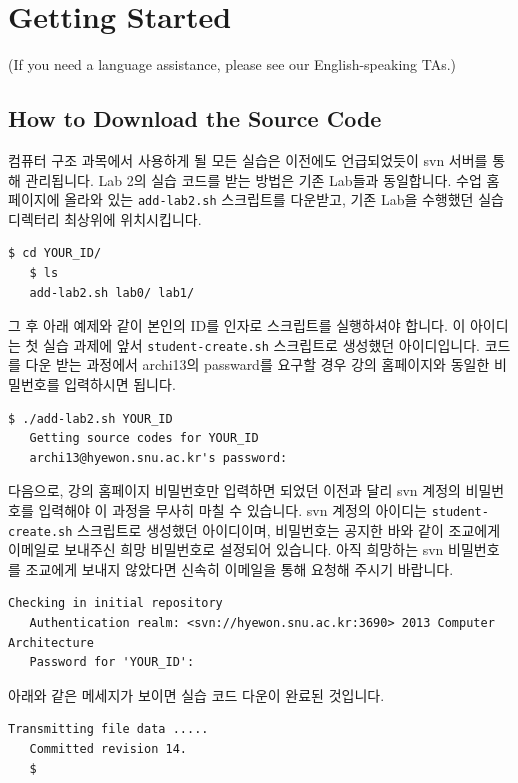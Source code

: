 \documentclass{article}
\begin{document}
\section{Getting Started}
(If you need a language assistance, please see our English-speaking TAs.)
\subsection{How to Download the Source Code}
컴퓨터 구조 과목에서 사용하게 될 모든 실습은 이전에도 언급되었듯이 svn 서버를 통해 관리됩니다.
Lab 2의 실습 코드를 받는 방법은 기존 Lab들과 동일합니다.
수업 홈페이지에 올라와 있는 \texttt{add-lab2.sh} 스크립트를 다운받고,
기존 Lab을 수행했던 실습 디렉터리 최상위에 위치시킵니다.

\begin{Verbatim}[frame=single]
   $ cd YOUR_ID/
   $ ls
   add-lab2.sh lab0/ lab1/
\end{Verbatim}
그 후 아래 예제와 같이 본인의 ID를 인자로 스크립트를 실행하셔야 합니다.
이 아이디는 첫 실습 과제에 앞서 \texttt{student-create.sh} 스크립트로 생성했던 아이디입니다.
코드를 다운 받는 과정에서 archi13의 passward를 요구할 경우 강의 홈페이지와 동일한 비밀번호를 입력하시면 됩니다.

\begin{Verbatim}[frame=single]
   $ ./add-lab2.sh YOUR_ID
   Getting source codes for YOUR_ID
   archi13@hyewon.snu.ac.kr's password: 
\end{Verbatim}
%
다음으로, 강의 홈페이지 비밀번호만 입력하면 되었던 이전과 달리 svn 계정의 비밀번호를 입력해야 이 과정을 무사히 마칠 수 있습니다.
svn 계정의 아이디는 \texttt{student-create.sh} 스크립트로 생성했던 아이디이며, 
비밀번호는 공지한 바와 같이 조교에게 이메일로 보내주신 희망 비밀번호로 설정되어 있습니다.
아직 희망하는 svn 비밀번호를 조교에게 보내지 않았다면 신속히 이메일을 통해 요청해 주시기 바랍니다.

\begin{Verbatim}[frame=single]
   Checking in initial repository
   Authentication realm: <svn://hyewon.snu.ac.kr:3690> 2013 Computer Architecture
   Password for 'YOUR_ID': 
\end{Verbatim}
아래와 같은 메세지가 보이면 실습 코드 다운이 완료된 것입니다.
\begin{Verbatim}[frame=single]
   Transmitting file data .....
   Committed revision 14.
   $
\end{Verbatim}
\end{document}
